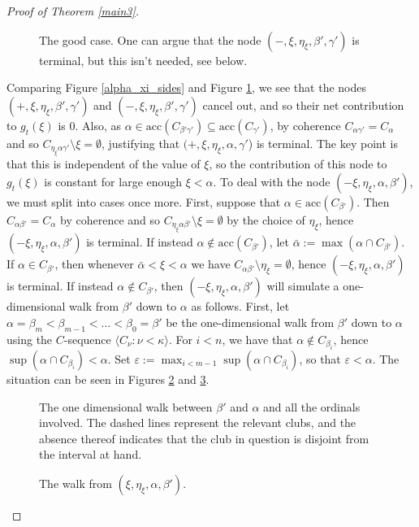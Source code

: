 \documentclass{amsart}
\numberwithin{theorem}{section}
\theoremstyle{definition}
\newcommand{\seq}[1]{{\langle{#1}\rangle}}
\renewcommand{\subset}{\subseteq}
\renewcommand{\epsilon}{\varepsilon}
\newcommand{\acc}{\mathrm{acc}}
\begin{document}
\begin{proof}[Proof of Theorem \ref{main3}]
\begin{itemize}
\begin{itemize}
\begin{figure}[ht]
\caption{The good case. One can argue that the node $(-,\xi,\eta_\xi,\beta',\gamma')$ is terminal, but this isn't needed, see below.}
\label{good_step}
\end{figure}

Comparing Figure \ref{alpha_xi_sides} and Figure \ref{good_step}, we see that the nodes $(+,\xi,\eta_\xi,\beta',\gamma')$ and $(-,\xi,\eta_\xi,\beta',\gamma')$ cancel out, and so their net contribution to $g_t(\xi)$ is $0$. Also, as $\alpha\in \acc(C_{\beta'\gamma'})\subset \acc(C_{\gamma'})$, by coherence $C_{\alpha\gamma'}=C_\alpha$ and so $C_{\eta_\xi\alpha\gamma'}\setminus\xi=\emptyset$, justifying that $(+,\xi,\eta_\xi,\alpha,\gamma'$) is terminal. The key point is that this is independent of the value of $\xi$, so the contribution of this node to $g_t(\xi)$ is constant for large enough $\xi<\alpha$. To deal with the node $(-\xi,\eta_\xi,\alpha,\beta')$, we must split into cases once more. First, suppose that $\alpha\in\acc(C_{\beta'})$. Then $C_{\alpha\beta'}=C_\alpha$ by coherence and so $C_{\eta_\xi\alpha\beta'}\setminus\xi=\emptyset$ by the choice of $\eta_\xi$, hence $(-\xi,\eta_\xi,\alpha,\beta')$ is terminal. If instead $\alpha\not\in\acc(C_{\beta'})$, let $\bar\alpha:=\max(\alpha\cap C_{\beta'})$. If $\alpha\in C_{\beta'}$, then whenever $\bar\alpha<\xi<\alpha$ we have $C_{\alpha\beta'}\setminus \eta_\xi=\emptyset$, hence $(-\xi,\eta_\xi,\alpha,\beta')$ is terminal. If instead $\alpha\not\in C_{\beta'}$, then $(-\xi,\eta_\xi,\alpha,\beta')$ will simulate a one-dimensional walk from $\beta'$ down to $\alpha$ as follows. First, let $\alpha=\beta_m<\beta_{m-1}<\dots<\beta_0=\beta'$ be the one-dimensional walk from $\beta'$ down to $\alpha$ using the $C$-sequence $\seq{C_\nu:\nu<\kappa}$. For $i<n$, we have that $\alpha\not\in C_{\beta_i}$, hence $\sup(\alpha\cap C_{\beta_i})<\alpha$. Set $\epsilon:=\max_{i<m-1}\sup(\alpha\cap C_{\beta_i})$, so that $\epsilon<\alpha$. The situation can be seen in Figures \ref{1dwalk} and \ref{1dstep}.

\begin{figure}[ht]
\caption{The one dimensional walk between $\beta'$ and $\alpha$ and all the ordinals involved. The dashed lines represent the relevant clubs, and the absence thereof indicates that the club in question is disjoint from the interval at hand.}
\label{1dwalk}
\end{figure}

\begin{figure}[ht]
\caption{The walk from $(\xi,\eta_\xi,\alpha,\beta')$. }
\label{1dstep}
\end{figure}


\end{itemize}
\end{itemize}
\end{proof}
\end{document}
